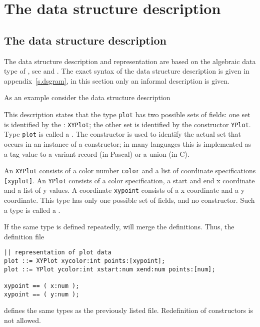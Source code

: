 \chapter{The data structure description}
\label{s.ds}
\section{The data structure description}
The data structure description and representation are based on the algebraic
data type of {\Miranda}, see \cite{c.mira} and \cite{c.miraover}.
The exact syntax of the data structure description is given in
appendix~\ref{s.dsgram},
in this section only an informal description is given.
\par
As an example consider the data structure description
\par
\begin{listing}

\end{listing}
\label{plotds}
\par
This description states that the type {\tt plot} has two possible
sets of fields: one set is identified by the :
{\tt XYPlot}; the other set is identified by the constructor {\tt YPlot}.
Type {\tt plot} is called a .
The constructor is used to identify the actual set that occurs in an 
instance of a constructor; in many languages this is implemented as a
tag value to a variant record (in Pascal) or a union (in C).
\par
An {\tt XYPlot} consists of a color number {\tt color} and a list
of coordinate specifications {\tt [xyplot]}.
An {\tt YPlot} consists of a color specification,
a start and end x coordinate and a list of y values.
A coordinate {\tt xypoint} consists of a x coordinate and a y coordinate.
This type has only one possible set of fields, and no constructor.
Such a type is called a .
\par
If the same type is defined repeatedly, {\Tm} will merge the definitions.
Thus, the definition file
\begin{listing}
\begin{verbatim}
|| representation of plot data
plot ::= XYPlot xycolor:int points:[xypoint];
plot ::= YPlot ycolor:int xstart:num xend:num points:[num];

xypoint == ( x:num );
xypoint == ( y:num );
\end{verbatim}
\end{listing}
defines the same types as the previously listed file.
Redefinition of constructors is not allowed.
